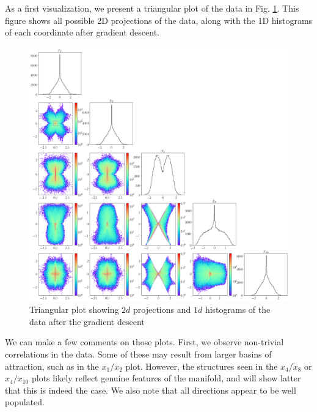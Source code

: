\documentclass[11pt]{article}
\begin{document}
		As a first visualization, we present a triangular plot of the data in Fig. \ref{triangular_plot_1_2_4_8_10}. This figure shows all possible 2D projections of the data, along with the 1D histograms of each coordinate after gradient descent.
		\begin{figure}[h!]
			\centering
			\includegraphics[scale = 0.3]{Figures/triangular_plot_1_2_4_8_10.png} %
			\caption{Triangular plot showing $2d$ projections and $1d$ histograms of the data after the gradient descent}
			\label{triangular_plot_1_2_4_8_10}
		\end{figure}
		We can make a few comments on those plots. First, we observe non-trivial correlations in the data. Some of these may result from larger basins of attraction, such as in the $x_1/x_2$ plot. However, the structures seen in the $x_4/\tilde{x}_8$ or $x_4/x_{10}$ plots likely reflect genuine features of the manifold, and will show latter that this is indeed the case. We also note that all directions appear to be well populated. 
\end{document}
